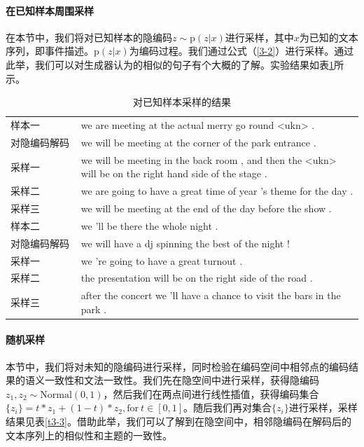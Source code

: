 \documentclass[]{template}
\begin{document}
\paragraph{在已知样本周围采样}  
在本节中，我们将对已知样本的隐编码$z \sim \mathrm{p}(z|x)$进行采样，其中$x$为已知的文本序列，即事件描述。$\mathrm{p}(z|x)$为编码过程。我们通过公式（\ref{3-2}）进行采样。通过此举，我们可以对生成器认为的相似的句子有个大概的了解。实验结果如表\ref{t3-2}所示。 
\begin{table}[htb]
    \center
    \caption{\label{t3-2}对已知样本采样的结果}
    \begin{tabular*}{\linewidth}{p{0.2\linewidth}p{0.8\linewidth}}
\toprule
样本一 & we are meeting at the actual merry go round <ukn> . \\
对隐编码解码 & we will be meeting at the corner of the park entrance .\\ 
采样一 & we will be meeting in the back room , and then the <ukn> will be on the right hand side of the stage .\\
采样二 & we are going to have a great time of year 's theme for the day . \\
采样三 & we will be meeting at the end of the day before the show . \\
\midrule
样本二 & we 'll be there the whole night . \\
对隐编码解码 & we will have a dj spinning the best of the night !\\ 
采样一 & we 're going to have a great turnout .\\
采样二 & the presentation will be on the right side of the road .\\
采样三 & after the concert we 'll have a chance to visit the bars in the park . \\
\bottomrule
    \end{tabular*}
\end{table}
\paragraph{随机采样}
本节中，我们将对未知的隐编码进行采样，同时检验在编码空间中相邻点的编码结果的语义一致性和文法一致性。我们先在隐空间中进行采样，获得隐编码$z_1,z_2 \sim \mathrm{Normal}(0,1)$，然后我们在两点间进行线性插值，获得编码集合$\{z_i\} = t*z_1+(1-t)*z_2 ,\mathrm{for}\ t \in [0,1]$。随后我们再对集合$\{z_i\}$进行采样，采样结果见表\ref{t3-3}。借助此举，我们可以了解到在隐空间中，相邻隐编码在解码后的文本序列上的相似性和主题的一致性。 
\end{document}
